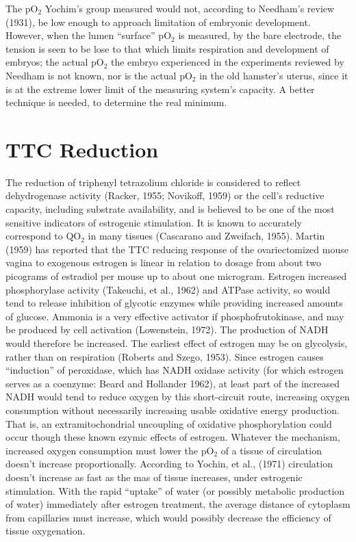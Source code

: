 The pO$_{2}$ Yochim's group measured would not, according to Needham's review (1931), be low enough to approach limitation of embryonic development. However, when the lumen ``surface'' pO$_{2}$ is measured, by the bare electrode, the tension is seen to be lose to that which limits respiration and development of embryos; the actual pO$_{2}$ the embryo experienced in the experiments reviewed by Needham is not known, nor is the actual pO$_{2}$ in the old hamster's uterus, since it is at the extreme lower limit of the measuring system's capacity. A better technique is needed, to determine the real minimum.

\section{TTC Reduction}

The reduction of triphenyl tetrazolium chloride is considered to reflect dehydrogenase activity (Racker, 1955; Novikoff, 1959) or the cell's reductive capacity, including substrate availability, and is believed to be one of the most sensitive indicators of estrogenic stimulation. It is known to accurately correspond to QO$_{2}$ in many tissues (Cascarano and Zweifach, 1955). Martin (1959) has reported that the TTC reducing response of the ovariectomized mouse vagina to exogenous estrogen is linear in relation to dosage from about two picograms of estradiol per mouse up to about one microgram. Estrogen increased phosphorylase activity (Takeuchi, et al., 1962) and ATPase activity, so would tend to release inhibition of glycotic enzymes while providing increased amounts of glucose. Ammonia is a very effective activator if phosphofrutokinase, and may be produced by cell activation (Lowenstein, 1972). The production of NADH would therefore be increased. The earliest effect of estrogen may be on glycolysis, rather than on respiration (Roberts and Szego, 1953). Since estrogen causes ``induction'' of peroxidase, which has NADH oxidase activity (for which estrogen serves as a coenzyme: Beard and Hollander 1962), at least part of the increased NADH would tend to reduce oxygen by this short-circuit route, increasing oxygen consumption without necessarily increasing usable oxidative energy production. That is, an extramitochondrial uncoupling of oxidative phosphorylation could occur though these known ezymic effects of estrogen. Whatever the mechanism, increased oxygen consumption must lower the pO$_{2}$ of a tissue of circulation doesn't increase proportionally. According to Yochin, et al., (1971) circulation doesn't increase as fast as the mas of tissue increases, under estrogenic stimulation. With the rapid ``uptake'' of water (or possibly metabolic production of water) immediately after estrogen treatment, the average distance of cytoplasm from capillaries must increase, which would possibly decrease the efficiency of tissue oxygenation.


